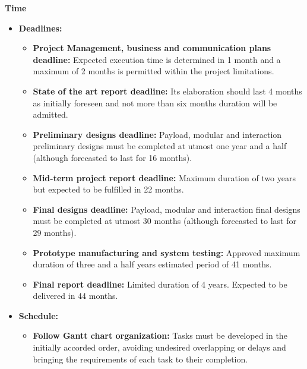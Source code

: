 \textbf{Time}

\begin{itemize}
	
	\item \textbf{Deadlines:}
	
	\begin{itemize}
		
		\item \textbf{Project Management, business and communication plans deadline:} Expected execution time is determined in 1 month and a maximum of 2 months is permitted within the project limitations.
		
		\item \textbf{State of the art report deadline:} Its elaboration should last 4 months as initially foreseen and not more than six months duration will be admitted.
		
		\item \textbf{Preliminary designs deadline:} Payload, modular and interaction preliminary designs must be completed at utmost one year and a half (although forecasted to last for 16 months). 
		
		\item \textbf{Mid-term project report deadline:} Maximum duration of two years but expected to be fulfilled in 22 months.
		
		\item \textbf{Final designs deadline:} Payload, modular and interaction final designs must be completed at utmost 30 months (although forecasted to last for 29 months).
		
		\item \textbf{Prototype manufacturing and system testing:} Approved maximum duration of three and a half years estimated period of 41 months.
		
		\item \textbf{Final report deadline:} Limited duration of 4 years. Expected to be delivered in 44 months.
		
	\end{itemize}
	
	\item \textbf{Schedule:}
	
	\begin{itemize}
		\item \textbf{Follow Gantt chart organization:} Tasks must be developed in the initially accorded order, avoiding undesired overlapping or delays and bringing the requirements of each task to their completion.
	\end{itemize}
	

\end{itemize}

